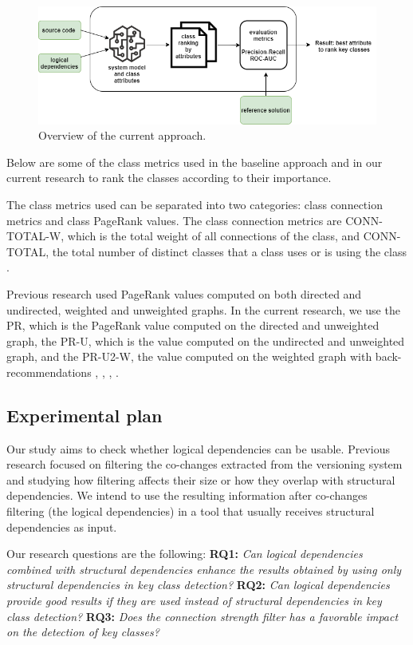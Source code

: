 \documentclass[runningheads]{comsis2}
\begin{document}
\begin{figure}
\centering
\includegraphics[scale=0.43]{current_approach.PNG}
\caption{Overview of the current approach.}
\label{fig:baseline_approach}
\centering
\end{figure}
Below are some of the class metrics used in the baseline approach and in our current research to rank the classes according to their importance. 

The class metrics used can be separated into two categories: class connection metrics and class PageRank values.
The class connection metrics are CONN-TOTAL-W, which is the total weight of all connections of the class, and CONN-TOTAL, the total number of distinct classes that a class uses or is using the class \cite{Finding-key-classes}.

Previous research used PageRank values computed on both directed and undirected, weighted and unweighted graphs. In the current research, we use the PR, which is the PageRank value computed on the directed and unweighted graph, the PR-U, which is the value computed on the undirected and unweighted graph, and the PR-U2-W, the value computed on the weighted graph with back-recommendations \cite{PagerankENASE}, \cite{enase15}, \cite{Finding-key-classes}, \cite{PagerankSACI}.


\subsection{Experimental plan}
\label{sec:plan}

Our study aims to check whether logical dependencies can be usable. Previous research focused on filtering the co-changes extracted from the versioning system and studying how filtering affects their size or how they overlap with structural dependencies. We intend to use the resulting information after co-changes filtering (the logical dependencies) in a tool that usually receives structural dependencies as input.

Our research questions are the following: \textbf{RQ1:} \textit{Can logical dependencies combined with structural dependencies enhance the results obtained by using only structural dependencies in key class detection?} \textbf{RQ2:} \textit{Can logical dependencies provide good results if they are used instead of structural dependencies in key class detection?} \textbf{RQ3:} \textit{ Does the connection strength filter has a favorable impact on the detection of key classes?}
\end{document}
